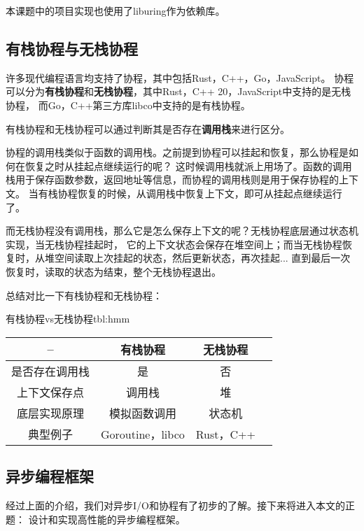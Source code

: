 \documentclass[supercite]{HustGraduPaper}
\theoremstyle{definition}
\begin{document}
本课题中的项目实现也使用了liburing作为依赖库。\par

\subsection{有栈协程与无栈协程}
许多现代编程语言均支持了协程，其中包括Rust，C++，Go，JavaScript。
协程可以分为\textbf{有栈协程}和\textbf{无栈协程}，其中Rust，C++ 20，JavaScript中支持的是无栈协程，
而Go，C++第三方库libco中支持的是有栈协程。\par

有栈协程和无栈协程可以通过判断其是否存在\textbf{调用栈}来进行区分。\par

协程的调用栈类似于函数的调用栈。之前提到协程可以挂起和恢复，那么协程是如何在恢复之时从挂起点继续运行的呢？
这时候调用栈就派上用场了。函数的调用栈用于保存函数参数，返回地址等信息，而协程的调用栈则是用于保存协程的上下文。
当有栈协程恢复的时候，从调用栈中恢复上下文，即可从挂起点继续运行了。\par

而无栈协程没有调用栈，那么它是怎么保存上下文的呢？无栈协程底层通过状态机实现，当无栈协程挂起时，
它的上下文状态会保存在堆空间上；而当无栈协程恢复时，从堆空间读取上次挂起的状态，然后更新状态，再次挂起...
直到最后一次恢复时，读取的状态为结束，整个无栈协程退出。\par

总结对比一下有栈协程和无栈协程：

\begin{generaltab}{有栈协程vs无栈协程}{tbl:hmm}
  \begin{tabular}{c|ccc}
    \toprule
    -- & 有栈协程 & 无栈协程 \\
    \midrule
    是否存在调用栈 & 是 & 否 \\
    上下文保存点 & 调用栈 & 堆 \\
    底层实现原理 & 模拟函数调用 & 状态机 \\
    典型例子 & Goroutine，libco & Rust，C++ \\
    \bottomrule
  \end{tabular}
\end{generaltab}

\subsection{异步编程框架}

经过上面的介绍，我们对异步I/O和协程有了初步的了解。接下来将进入本文的正题：
设计和实现高性能的异步编程框架。\par
\end{document}
